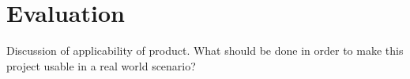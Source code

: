 \section{Evaluation}
Discussion of applicability of product. What should be done in order to make this project usable in a real world scenario?